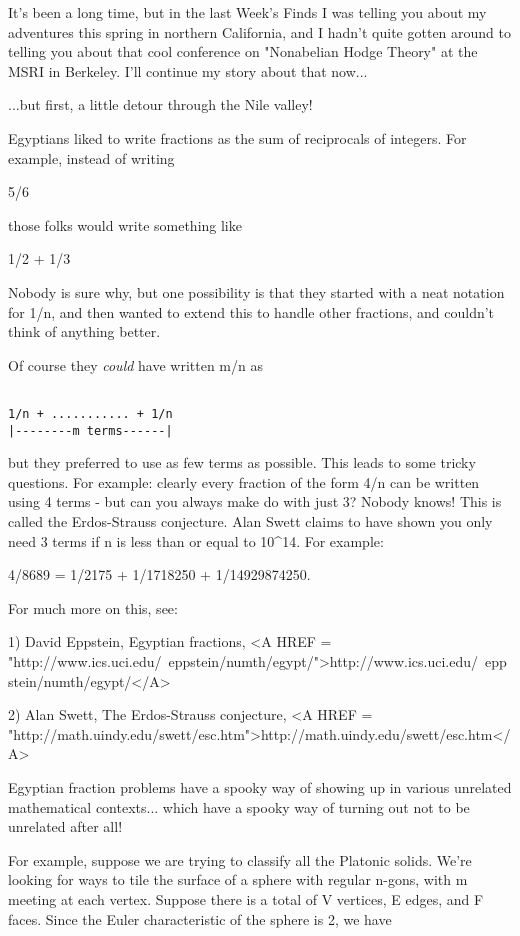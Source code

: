 

It's been a long time, but in the last Week's Finds I was telling you
about my adventures this spring in northern California, and I hadn't
quite gotten around to telling you about that cool conference on
"Nonabelian Hodge Theory" at the MSRI in Berkeley.  I'll continue my
story about that now...

...but first, a little detour through the Nile valley!  

Egyptians liked to write fractions as the sum of reciprocals of
integers.  For example, instead of writing 

5/6

those folks would write something like

1/2 + 1/3

Nobody is sure why, but one possibility is that they started with a 
neat notation for 1/n, and then wanted to extend this to handle other 
fractions, and couldn't think of anything better.

Of course they \emph{could} have written m/n as 


\begin{verbatim}

1/n + ........... + 1/n
|--------m terms------|
\end{verbatim}
    
but they preferred to use as few terms as possible.  This leads to some
tricky questions.  For example: clearly every fraction of the form 4/n
can be written using 4 terms - but can you always make do with just 3?
Nobody knows!  This is called the Erdos-Strauss conjecture.  Alan Swett
claims to have shown you only need 3 terms if n is less than or equal to 
10^{14}.  For example:

4/8689 = 1/2175 + 1/1718250 + 1/14929874250.

For much more on this, see:

1) David Eppstein, Egyptian fractions, 
<A HREF = "http://www.ics.uci.edu/~eppstein/numth/egypt/">http://www.ics.uci.edu/~eppstein/numth/egypt/</A>

2) Alan Swett, The Erdos-Strauss conjecture, <A HREF = "http://math.uindy.edu/swett/esc.htm">http://math.uindy.edu/swett/esc.htm</A>

Egyptian fraction problems have a spooky way of showing up in
various unrelated mathematical contexts... which have a spooky way 
of turning out not to be unrelated after all!

For example, suppose we are trying to classify all the Platonic
solids.  We're looking for ways to tile the surface of a sphere
with regular n-gons, with m meeting at each vertex.  Suppose there
is a total of V vertices, E edges, and F faces.  Since the Euler
characteristic of the sphere is 2, we have

